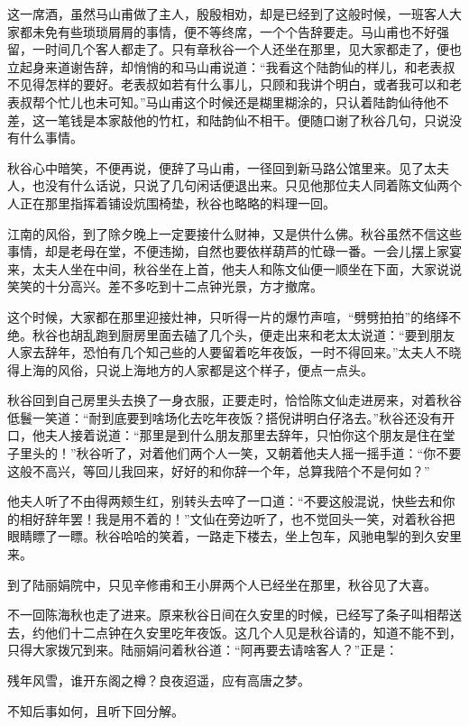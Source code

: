 \documentclass[12pt,UTF8]{ctexbook}
\begin{document}
{{{这一席酒，虽然马山甫做了主人，殷殷相劝，却是已经到了这般时候，一班客人大家都未免有些琐琐屑屑的事情，便不等终席，一个个告辞要走。马山甫也不好强留，一时间几个客人都走了。只有章秋谷一个人还坐在那里，见大家都走了，便也立起身来道谢告辞，却悄悄的和马山甫说道：“我看这个陆韵仙的样儿，和老表叔不见得怎样的要好。老表叔如若有什么事儿，只顾和我讲个明白，或者我可以和老表叔帮个忙儿也未可知。”马山甫这个时候还是糊里糊涂的，只认着陆韵仙待他不差，这一笔钱是本家敲他的竹杠，和陆韵仙不相干。便随口谢了秋谷几句，只说没有什么事情。

秋谷心中暗笑，不便再说，便辞了马山甫，一径回到新马路公馆里来。见了太夫人，也没有什么话说，只说了几句闲话便退出来。只见他那位夫人同着陈文仙两个人正在那里指挥着铺设炕围椅垫，秋谷也略略的料理一回。

江南的风俗，到了除夕晚上一定要接什么财神，又是供什么佛。秋谷虽然不信这些事情，却是老母在堂，不便违拗，自然也要依样葫芦的忙碌一番。一会儿摆上家宴来，太夫人坐在中间，秋谷坐在上首，他夫人和陈文仙便一顺坐在下面，大家说说笑笑的十分高兴。差不多吃到十二点钟光景，方才撤席。

这个时候，大家都在那里迎接灶神，只听得一片的爆竹声喧，“劈劈拍拍”的络绎不绝。秋谷也胡乱跑到厨房里面去磕了几个头，便走出来和老太太说道：“要到朋友人家去辞年，恐怕有几个知己些的人要留着吃年夜饭，一时不得回来。”太夫人不晓得上海的风俗，只说上海地方的人家都是这个样子，便点一点头。

秋谷回到自己房里头去换了一身衣服，正要走时，恰恰陈文仙走进房来，对着秋谷低鬟一笑道：“耐到底要到啥场化去吃年夜饭？搭倪讲明白仔洛去。”秋谷还没有开口，他夫人接着说道：“那里是到什么朋友那里去辞年，只怕你这个朋友是住在堂子里头的！”秋谷听了，对着他们两个人一笑，又朝着他夫人摇一摇手道：“你不要这般不高兴，等回儿我回来，好好的和你辞一个年，总算我陪个不是何如？”

他夫人听了不由得两颊生红，别转头去啐了一口道：“不要这般混说，快些去和你的相好辞年罢！我是用不着的！”文仙在旁边听了，也不觉回头一笑，对着秋谷把眼睛瞟了一瞟。秋谷哈哈的笑着，一路走下楼去，坐上包车，风驰电掣的到久安里来。

到了陆丽娟院中，只见辛修甫和王小屏两个人已经坐在那里，秋谷见了大喜。

不一回陈海秋也走了进来。原来秋谷日间在久安里的时候，已经写了条子叫相帮送去，约他们十二点钟在久安里吃年夜饭。这几个人见是秋谷请的，知道不能不到，只得大家拨冗到来。陆丽娟问着秋谷道：“阿再要去请啥客人？”正是：

残年风雪，谁开东阁之樽？良夜迢遥，应有高唐之梦。

不知后事如何，且听下回分解。





}}}
\end{document}
